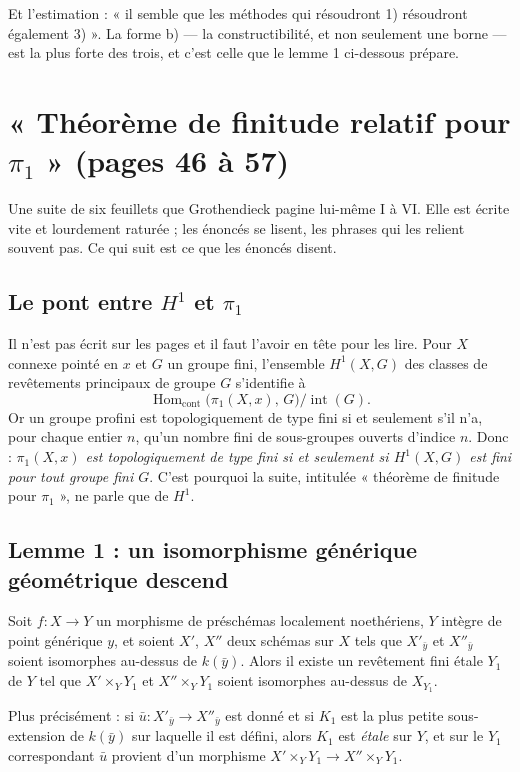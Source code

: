 \documentclass[11pt,a4paper]{article}
\begin{document}
Et l'estimation : « il semble que les méthodes qui résoudront 1) résoudront
également 3) ». La forme b) --- la constructibilité, et non seulement une
borne --- est la plus forte des trois, et c'est celle que le lemme 1 ci-dessous
prépare.

\section*{« Théorème de finitude relatif pour $\pi_{1}$ » (pages 46 à 57)}

Une suite de six feuillets que Grothendieck pagine lui-même I à VI. Elle est
écrite vite et lourdement raturée ; les énoncés se lisent, les phrases qui les
relient souvent pas. Ce qui suit est ce que les énoncés disent.

\subsection*{Le pont entre $H^{1}$ et $\pi_{1}$}

Il n'est pas écrit sur les pages et il faut l'avoir en tête pour les lire. Pour
$X$ connexe pointé en $x$ et $G$ un groupe fini, l'ensemble $H^{1}(X,G)$ des
classes de revêtements principaux de groupe $G$ s'identifie à
\[
  \operatorname{Hom}_{\mathrm{cont}}\bigl(\pi_{1}(X,x),\, G\bigr) \big/
  \operatorname{int}(G) .
\]
Or un groupe profini est topologiquement de type fini si et seulement s'il n'a,
pour chaque entier $n$, qu'un nombre fini de sous-groupes ouverts d'indice $n$.
Donc : \emph{$\pi_{1}(X,x)$ est topologiquement de type fini si et seulement si
$H^{1}(X,G)$ est fini pour tout groupe fini $G$}. C'est pourquoi la suite,
intitulée « théorème de finitude pour $\pi_{1}$ », ne parle que de $H^{1}$.

\subsection*{Lemme 1 : un isomorphisme générique géométrique descend}

Soit $f : X \to Y$ un morphisme de préschémas localement noethériens, $Y$
intègre de point générique $y$, et soient $X'$, $X''$ deux schémas sur $X$ tels
que $X'_{\bar{y}}$ et $X''_{\bar{y}}$ soient isomorphes au-dessus de
$k(\bar{y})$. Alors il existe un revêtement fini étale $Y_{1}$ de $Y$ tel que
$X' \times_{Y} Y_{1}$ et $X'' \times_{Y} Y_{1}$ soient isomorphes au-dessus de
$X_{Y_{1}}$.

Plus précisément : si $\bar{u} : X'_{\bar{y}} \to X''_{\bar{y}}$ est donné et
si $K_{1}$ est la plus petite sous-extension de $k(\bar{y})$ sur laquelle il
est défini, alors $K_{1}$ est \emph{étale} sur $Y$, et sur le $Y_{1}$
correspondant $\bar{u}$ provient d'un morphisme
$X' \times_{Y} Y_{1} \to X'' \times_{Y} Y_{1}$.
\end{document}
